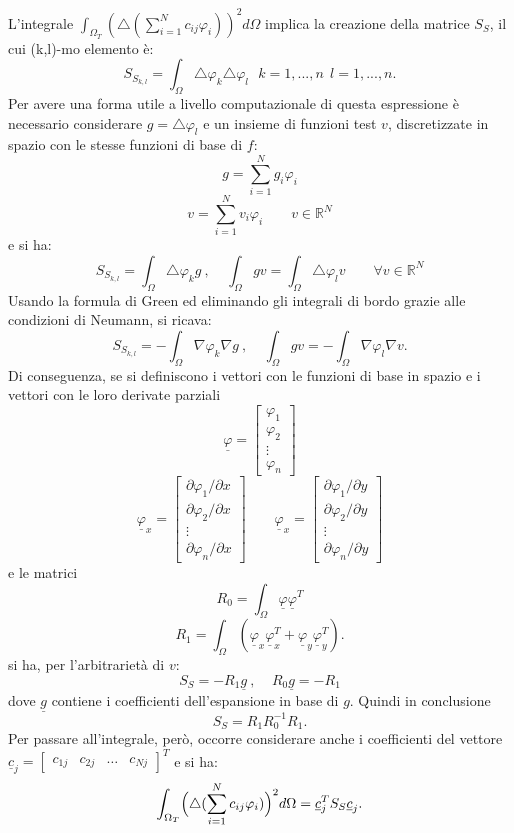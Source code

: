 \documentclass[a4paper,11pt,twoside,openright]{book}							%
\begin{document}
L'integrale $\int_{\Omega_T} ( \triangle(\sum_{i=1}^N  c_{ij}\varphi_i ) )^2 d \Omega$ implica la creazione della matrice $S_S$, il cui (k,l)-mo elemento è:
$$S_{S_{k,l}} = \int_\Omega \triangle \varphi_k \triangle \varphi_l \ \ \ k = 1, ... , n\ \ l = 1, ... , n.$$
Per avere una forma utile a livello computazionale di questa espressione è necessario considerare $ g = \triangle\varphi_l $ e un insieme di funzioni test $v$, discretizzate in spazio con le stesse funzioni di base di $f$:
$$
g=\sum_{i=1}^N  g_i\varphi_i
$$
$$
v=\sum_{i=1}^N  v_i\varphi_i \qquad v \in \mathbb{R}^N
$$
e si ha:
$$ S_{S_{k,l}} = \int_\Omega \triangle \varphi_k g \ , \ \ \ \ \ \int_\Omega g v = \int_\Omega \triangle \varphi_l v \qquad \forall v \in \mathbb{R}^N$$
Usando la formula di Green ed eliminando gli integrali di bordo grazie alle condizioni di Neumann, si ricava:
$$S_{S_{k,l}} = -\int_\Omega \nabla \varphi_k \nabla g \ , \ \ \ \ \ \int_\Omega g v = -\int_\Omega \nabla \varphi_l \nabla v.$$
Di conseguenza, se si definiscono i vettori con le funzioni di base in spazio e i vettori con le loro derivate parziali
$$
\underline \varphi =
\begin{bmatrix}
\varphi_{1}  \\
\varphi_{2}  \\
\vdots\\
\varphi_{n}
\end{bmatrix}
$$
\begin{equation}
\underline \varphi_x=  \begin{bmatrix}
\partial \varphi_{1}/\partial x \\
\partial \varphi_{2}/\partial x  \\
\vdots\\
\partial \varphi_{n}/\partial x \end{bmatrix} 
\qquad
\underline \varphi_x=  \begin{bmatrix}
\partial \varphi_{1}/\partial y  \\
\partial \varphi_{2}/\partial y  \\
\vdots\\
\partial \varphi_{n}/\partial y\end{bmatrix} 
\end{equation}
e le matrici
$$ R_0 = \int_\Omega \underline \varphi \underline \varphi^T $$
$$ R_1 = \int_\Omega (\underline \varphi_x \underline \varphi_x^T + \underline \varphi_y \underline \varphi_y^T). $$
si ha, per l'arbitrarietà di $v$: 
$$ S_S= - R_1 \underline g \ , \ \ \ \ \ R_0 \underline g = - R_1  $$
dove $\underline g$ contiene i coefficienti dell'espansione in base di $g$. Quindi in conclusione
$$ S_S = R_1 R_0^{-1} R_1 .$$
Per passare all'integrale, però, occorre considerare anche i coefficienti del vettore $\underline c_j =
\begin{bmatrix}
c_{1j} & c_{2j} & \hdots & c_{Nj}
\end{bmatrix}^T$
e si ha:
$$
\int_{\Omega_T} \Bigl( \triangle(\sum_{i=1}^N  c_{ij}\varphi_i ) \Bigr)^2 d \Omega =\underline c^T_j S_S \underline c_j .
$$
\end{document}
